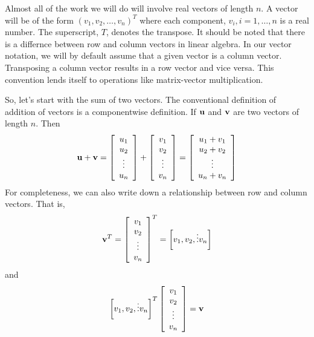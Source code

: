 \documentclass[10pt,fleqn]{article}
\begin{document}
Almost all of the work we will do will involve real vectors of length $n$. A
vector will be of the form $(v_1, v_2, \ldots, v_n)^T$ where each component,
$v_i, i=1,\ldots, n$ is a real number. The superscript, $T$, denotes the
transpose. It should be noted that there is a differnce between row and column
vectors in linear algebra. In our vector notation, we will by default assume
that a given vector is a column vector. Transposing a column vector results in
a row vector and vice versa. This convention lends itself to operations like
matrix-vector multiplication. 

So, let's start with the sum of two vectors. The conventional definition of
addition of vectors is a componentwise definition. If ${\bf u}$ and ${\bf v}$
are two vectors of length $n$. Then
$$
  {\bf u} + {\bf v} = 
       \left[
         \begin{array}{c}
           u_1 \\
           u_2 \\
           \vdots \\
           u_n
         \end{array}
       \right]
     + \left[
         \begin{array}{c}
           v_1 \\
           v_2 \\
           \vdots \\
           v_n
         \end{array}
       \right]
     = \left[
         \begin{array}{c}
           u_1 + v_1 \\
           u_2 + v_2 \\
           \vdots \\
           u_n + v_n
         \end{array}
       \right]
$$
For completeness, we can also write down a relationship between row and column
vectors. That is,
$$
  {\bf v}^T = 
       \left[
         \begin{array}{c}
           v_1 \\
           v_2 \\
           \vdots \\
           v_n
         \end{array}
       \right]^T
     = \left[
         v_1, v_2, \vdots v_n
       \right]
$$
and
\noindent
$$
  \left[ v_1, v_2, \vdots v_n \right]^T
       \left[
         \begin{array}{c}
           v_1 \\
           v_2 \\
           \vdots \\
           v_n
         \end{array}
       \right] = {\bf v}
$$
\end{document}
